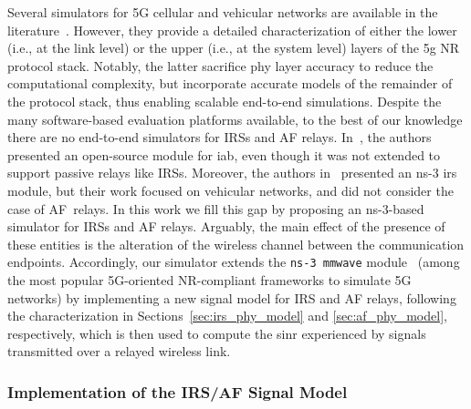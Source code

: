 Several simulators for 5G cellular and vehicular networks are available in the literature~\cite{mezzavilla2018end,choi20195g, nardini2020simu5g, patriciello2019e2e, pratschner2018versatile, muller2018flexible, jao2018wise,drago2020millicar}. However, they provide a detailed characterization of either the lower (i.e., at the link level) or the upper (i.e., at the system level) layers of the \gls{5g} NR protocol stack. 
Notably, the latter sacrifice \gls{phy} layer accuracy to reduce the computational complexity, but incorporate accurate models of the remainder of the protocol stack, thus enabling scalable end-to-end simulations.
Despite the many software-based evaluation platforms available, to the best of our knowledge there are no end-to-end simulators for IRSs and AF relays. In~\cite{polese2018end}, the authors presented an open-source module for \gls{iab}, even though it was not extended to support passive relays like IRSs. 
Moreover, the authors in~\cite{heimann2021modeling} presented an ns-3 \gls{irs} module, but their work focused on vehicular networks, and did not consider the case of AF~relays. 
In this work we fill this gap by proposing an ns-3-based simulator for IRSs and AF relays.
Arguably, the main effect of the presence of these entities is the alteration of the wireless channel between the communication endpoints. 
Accordingly, our simulator extends the \texttt{ns-3 mmwave} module~\cite{mezzavilla2018end} (among the most popular 5G-oriented NR-compliant frameworks to simulate 5G networks) by implementing a new signal model for IRS and AF relays, following the characterization in Sections~\ref{sec:irs_phy_model} and \ref{sec:af_phy_model}, respectively, which is then used to compute the \gls{sinr} experienced by signals transmitted over a relayed wireless link. 

\subsubsection{Implementation of the IRS/AF Signal Model} 
\label{sec:ext_ch_model}
 
